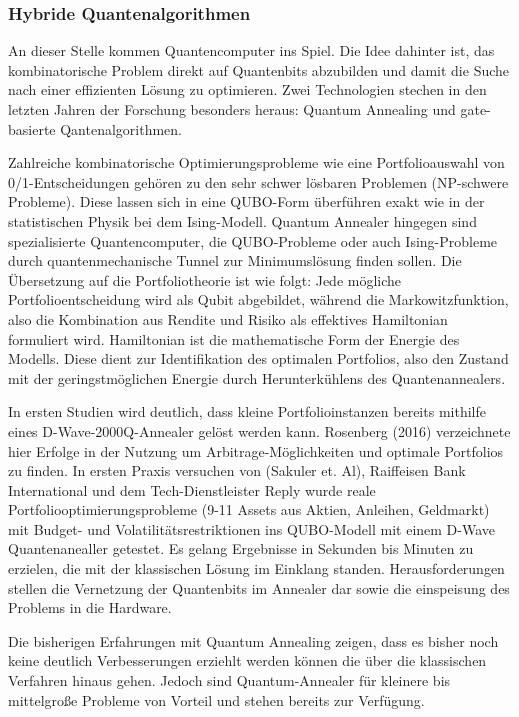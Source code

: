 \subsubsection*{Hybride Quantenalgorithmen}
An dieser Stelle kommen Quantencomputer ins Spiel. Die Idee dahinter ist, das kombinatorische Problem direkt auf Quantenbits abzubilden und damit die Suche nach einer effizienten Lösung zu optimieren. Zwei Technologien stechen in den letzten Jahren der Forschung besonders heraus: Quantum Annealing und gate-basierte Qantenalgorithmen. \cite{Mugel et al., 2022,Orus et al., 2019} 

Zahlreiche kombinatorische Optimierungsprobleme wie eine Portfolioauswahl von 0/1-Entscheidungen gehören zu den sehr schwer lösbaren Problemen (NP-schwere Probleme). Diese lassen sich in eine QUBO-Form überführen exakt wie in der statistischen Physik bei dem Ising-Modell. Quantum Annealer hingegen sind spezialisierte Quantencomputer, die QUBO-Probleme oder auch Ising-Probleme durch quantenmechanische Tunnel zur Minimumslösung finden sollen.  
\cite{Mugel et al., 2022}
Die Übersetzung auf die Portfoliotheorie ist wie folgt: Jede mögliche Portfolioentscheidung wird als Qubit abgebildet, während die Markowitzfunktion, also die Kombination aus Rendite und Risiko als effektives Hamiltonian formuliert wird. Hamiltonian ist die mathematische Form der Energie des Modells. Diese dient zur Identifikation des optimalen Portfolios, also den Zustand mit der geringstmöglichen Energie durch Herunterkühlens des Quantenannealers. \cite{Mugel et al., 2022}

In ersten Studien wird deutlich, dass kleine Portfolioinstanzen bereits mithilfe eines D-Wave-2000Q-Annealer gelöst werden kann. Rosenberg (2016) verzeichnete hier Erfolge in der Nutzung um Arbitrage-Möglichkeiten und optimale Portfolios zu finden. 
In ersten Praxis versuchen von (Sakuler et. Al), Raiffeisen Bank International und dem Tech-Dienstleister Reply wurde reale Portfoliooptimierungsprobleme (9-11 Assets aus Aktien, Anleihen, Geldmarkt) mit Budget- und Volatilitätsrestriktionen ins QUBO-Modell mit einem D-Wave Quantenanealler getestet. Es gelang Ergebnisse in Sekunden bis Minuten zu erzielen, die mit der klassischen Lösung im Einklang standen. Herausforderungen stellen die Vernetzung der Quantenbits im Annealer dar sowie die einspeisung des Problems in die Hardware.\cite{Sakuler et al., 2025}

Die bisherigen Erfahrungen mit Quantum Annealing zeigen, dass es bisher noch keine deutlich Verbesserungen erziehlt werden können die über die klassischen Verfahren hinaus gehen. Jedoch sind Quantum-Annealer für kleinere bis mittelgroße Probleme von Vorteil und stehen bereits zur Verfügung. 

